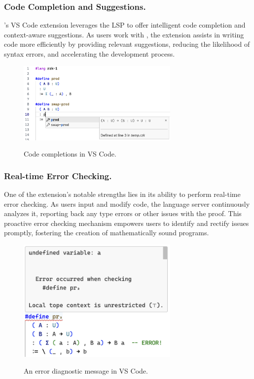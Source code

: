\subsubsection{Code Completion and Suggestions.}

\Rzk{}'s VS Code extension leverages the LSP to offer intelligent code completion
and context-aware suggestions. As users work with \Rzk{}, the extension assists
in writing code more efficiently by providing relevant suggestions, reducing
the likelihood of syntax errors, and accelerating the development process.

\begin{figure}
  \centering
  \includegraphics[width=0.7\textwidth]{figs/code-completions.png}
  \label{figure:code-completions}
  \caption{Code completions in VS Code.}
\end{figure}

\subsubsection{Real-time Error Checking.}

One of the extension's notable strengths lies in its ability to perform real-time error checking.
As users input and modify code, the language server continuously analyzes it,
reporting back any type errors or other issues with the proof.
This proactive error checking mechanism empowers users to identify and rectify issues promptly,
fostering the creation of mathematically sound programs.

\begin{figure}
  \centering
  \includegraphics[width=0.7\textwidth]{figs/diagnostic-message.png}
  \label{figure:diagnostic-message}
  \caption{An error diagnostic message in VS Code.}
\end{figure}

